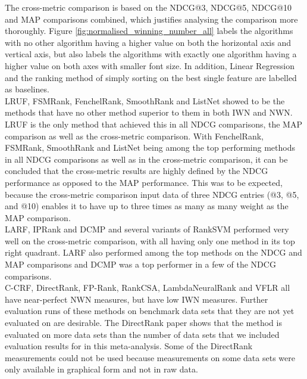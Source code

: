 The cross-metric comparison is based on the \ac{NDCG}@3, \ac{NDCG}@5, \ac{NDCG}@10 and \ac{MAP} comparisons combined, which justifies analysing the comparison more thoroughly. Figure \ref{fig:normalised_winning_number_all} labels the algorithms with no other algorithm having a higher value on both the horizontal axis and vertical axis, but also labels the algorithms with exactly one algorithm having a higher value on both axes with smaller font size. In addition, Linear Regression and the ranking method of simply sorting on the best single feature are labelled as baselines.\\

LRUF, FSMRank, FenchelRank, SmoothRank and ListNet showed to be the methods that have no other method superior to them in both \ac{IWN} and \ac{NWN}. LRUF is the only method that achieved this in all \ac{NDCG} comparisons, the \ac{MAP} comparison as well as the cross-metric comparison. With FenchelRank, FSMRank, SmoothRank and ListNet being among the top performing methods in all \ac{NDCG} comparisons as well as in the cross-metric comparison, it can be concluded that the cross-metric results are highly defined by the \ac{NDCG} performance as opposed to the \ac{MAP} performance. This was to be expected, because the cross-metric comparison input data of three \ac{NDCG} entries (@3, @5, and @10) enables it to have up to three times as many as many weight as the \ac{MAP} comparison.\\

LARF, \ac{IP}Rank and DCMP and several variants of Rank\ac{SVM} performed very well on the cross-metric comparison, with all having only one method in its top right quadrant. LARF also performed among the top methods on the \ac{NDCG} and \ac{MAP} comparisons and DCMP was a top performer in a few of the \ac{NDCG} comparisons.\\

C-CRF, DirectRank, FP-Rank, RankCSA, LambdaNeuralRank and VFLR all have near-perfect \ac{NWN} measures, but have low \ac{IWN} measures. Further evaluation runs of these methods on benchmark data sets that they are not yet evaluated on are desirable. The DirectRank paper \cite{Tan2013} shows that the method  is evaluated on more data sets than the number of data sets that we included evaluation results for in this meta-analysis. Some of the DirectRank measurements could not be used because measurements on some data sets were only available in graphical form and not in raw data.\\

